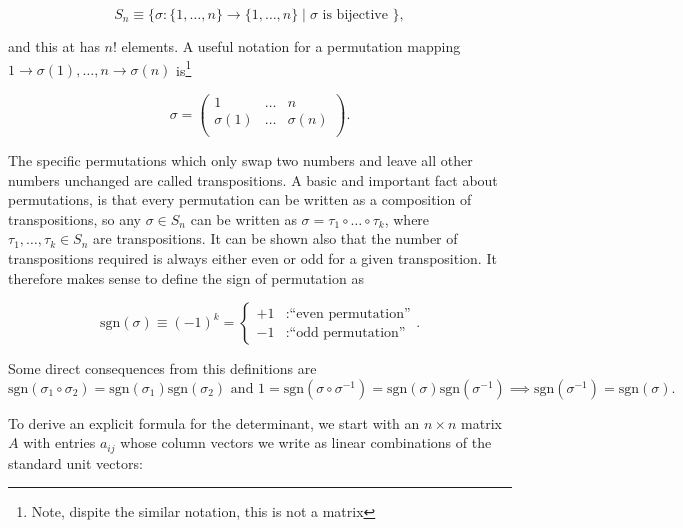 \documentclass[a4paper,12pt]{report}
\begin{document}
\begin{equation}
    S_{n} \equiv \{\sigma : \{1,\ldots ,n\} \rightarrow \{1,\ldots ,n\} \mid  \sigma \text{ is bijective } \}, 
\end{equation}

and this at has \(n!\) elements. A useful notation for a permutation mapping \(1 \rightarrow  \sigma (1), \ldots , n \rightarrow \sigma (n)\) is\footnote{Note, dispite the similar notation, this is not a matrix}

\begin{equation}
    \sigma = \begin{pmatrix}
        1 & \ldots  &  n \\
        \sigma (1) & \ldots  & \sigma (n)  \\
    \end{pmatrix}.
\end{equation}

The specific permutations which only swap two numbers and leave all other numbers unchanged are called transpositions. A basic and important fact about permutations, is that every permutation can be written as a composition of transpositions, so any \(\sigma \in  S_{n} \) can be written as \(\sigma = \tau _{1}  \circ \ldots \circ \tau _{k}  \), where \(\tau _{1}, \ldots , \tau _{k} \in  S_{n}  \) are transpositions. It can be shown also that the number of transpositions required is always either even or odd for a given transposition. It therefore makes sense to define the sign of permutation as 

\begin{equation}
    \text{sgn}(\sigma ) \equiv (-1)^{k} = 
    \begin{cases}
        +1 &: \text{``even permutation''} \\
        -1 &: \text{``odd permutation''}
    \end{cases}.  
\end{equation}

Some direct consequences from this definitions are \(\text{sgn}(\sigma _{1} \circ \sigma _{2}  ) = \text{sgn}(\sigma _{1} ) \text{sgn}(\sigma _{2} ) \text { and } 1 = \text{sgn}(\sigma \circ \sigma ^{-1} ) = \text{sgn}(\sigma )\text{sgn}(\sigma ^{-1} ) \implies \text{sgn}(\sigma ^{-1} ) = \text{sgn}(\sigma ).        \) 

To derive an explicit formula for the determinant, we start with an \(n \times n\) matrix \(A\) with entries \(a_{ij} \) whose column vectors we write as linear combinations of the standard unit vectors: 
\end{document}
